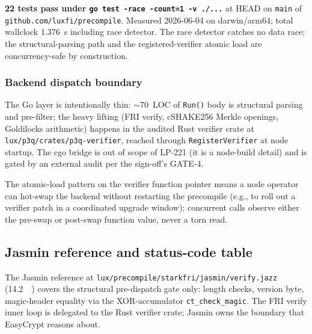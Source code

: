 \textbf{22 tests pass under \texttt{go test -race -count=1 -v ./...}}
at HEAD on \texttt{main} of \texttt{github.com/luxfi/precompile}.
Measured 2026-06-04 on darwin/arm64; total wallclock
\SI{1.376}{\second} including race detector. The race detector
catches no data race; the structural-parsing path and the
registered-verifier atomic load are concurrency-safe by construction.

\subsubsection{Backend dispatch boundary}

The Go layer is intentionally thin: $\sim$\SI{70}{LOC} of
\texttt{Run()} body is structural parsing and pre-filter; the heavy
lifting (FRI verify, cSHAKE256 Merkle openings, Goldilocks
arithmetic) happens in the audited Rust verifier crate at
\texttt{lux/p3q/crates/p3q-verifier}, reached through
\texttt{RegisterVerifier} at node startup. The cgo bridge is out of
scope of LP-221 (it is a node-build detail) and is gated by an
external audit per the sign-off's GATE-4.

The atomic-load pattern on the verifier function pointer means a
node operator can hot-swap the backend without restarting the
precompile (e.g., to roll out a verifier patch in a coordinated
upgrade window); concurrent calls observe either the pre-swap or
post-swap function value, never a torn read.

\subsection{Jasmin reference and status-code table}

The Jasmin reference at \texttt{lux/precompile/starkfri/jasmin/verify.jazz}
(\SI{14.2}{\kilo\byte}) covers the structural pre-dispatch gate
only: length checks, version byte, magic-header equality via the
XOR-accumulator \texttt{ct\_check\_magic}. The FRI verify inner
loop is delegated to the Rust verifier crate; Jasmin owns the
boundary that EasyCrypt reasons about.

